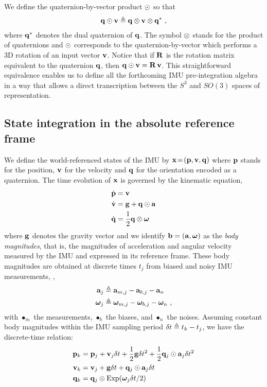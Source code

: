 We define the quaternion-by-vector product $\odot$ so that
%
\begin{align}
{\bf q}\odot{\bf v} \triangleq {\bf q}\otimes{\bf v}\otimes{\bf q}^*
~,
\end{align}
%
where ${\bf q}^*$ denotes the dual quaternion of ${\bf q}$. 
The symbol $\otimes$ stands for the product of quaternions and $\odot$ corresponds to the quaternion-by-vector which performs a 3D rotation of an input vector ${\bf v}$. 
Notice that if ${\bf R}$ is the rotation matrix equivalent to the quaternion ${\bf q}$, then 
%
${\bf q}\odot{\bf v} = {\bf R}\,{\bf v}$. 
%
This straightforward equivalence
enables us to define all the forthcoming IMU pre-integration algebra in a way that allows a direct transcription between the $S^3$  and $SO(3)$ spaces of representation.





\subsection{State integration in the absolute reference frame}

We define the world-referenced states of the IMU by \mbox{${\bf x}\!=\!({\bf p},{\bf v},{\bf q})$} where ${\bf p}$ stands for the position, ${\bf v}$ for the velocity and ${\bf q}$ for the orientation encoded as a quaternion.
The time evolution of ${\bf x}$ is governed by the kinematic equation,
%
\begin{align}\label{equ:cont_basic}
\begin{split}
\dot{{\bf p}} &= {\bf v} \\
\dot{{\bf v}} &= {\bf g} + {\bf q}\odot{\bf a} \\
\dot{{\bf q}} &= \frac12{\bf q}\otimes{{\bm \omega}} 
\end{split}
\end{align}
%
where ${\bf g}$ denotes the gravity vector and we identify ${\bf b}=({\bf a},{{\bm \omega}})$ as the \emph{body magnitudes}, that is, the magnitudes of acceleration and angular velocity measured by the IMU and expressed in its reference frame. These body magnitudes are obtained at discrete times $t_j$ from biased and noisy IMU measurements, \ie,
%
\begin{align}\label{equ:body}
\begin{split}
{\bf a}_j &\triangleq {\bf a}_{m,j} - {\bf a}_{b,j} - {\bf a}_n \\
{{\bm \omega}}_j  &\triangleq {{\bm \omega}}_{m,j}  - {{\bm \omega}}_{b,j}  - {{\bm \omega}}_n 
~,
\end{split}
\end{align}
%
with $\bullet_m$ the measurements, $\bullet_b$ the biases, and $\bullet_n$ the noises.
Assuming constant body magnitudes within the IMU sampling period $\delta t\triangleq t_k-t_j$, we have the discrete-time relation:
%
\begin{align}\label{equ:integration_state}
\begin{split}
{\bf p}_{k} &= {\bf p}_j + {\bf v}_j\delta t  + \frac12{\bf g}\delta t^2 + \frac12{\bf q}_j\odot{\bf a}_j\delta t^2 \\
{\bf v}_{k} &= {\bf v}_j + {\bf g}\delta t + {\bf q}_j\odot{\bf a}_j\delta t \\
{\bf q}_{k} &= {\bf q}_j\otimes\operatorname*{Exp}({{\bm \omega}}_j\delta t/2) 
\end{split}
\end{align}


